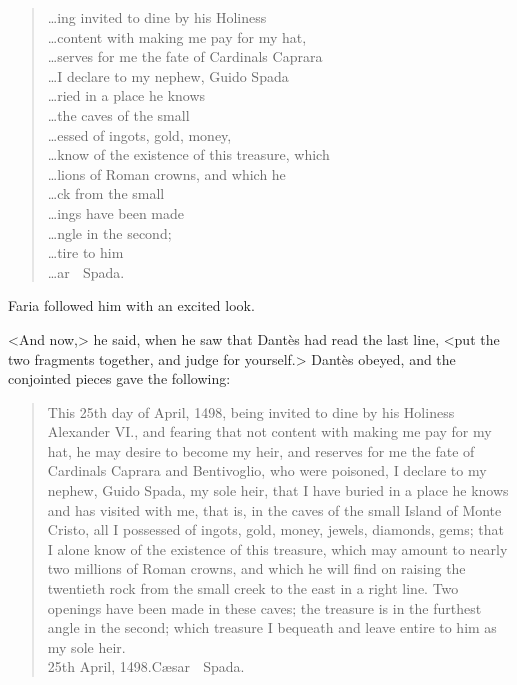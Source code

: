 \begin{quotation}\raggedleft\oldfont
 \dots ing invited to dine by his Holiness\\         
 \dots con\-tent with making me pay for my hat,\\    
 \dots serves for me the fate of Cardinals Cap\-ra\-ra\\            
 \dots I declare to my nephew, Guido Spada\\                       
 \dots ried in a place he knows\\                         
 \dots the caves of the small\\                  
 \dots essed of ingots, gold, money,\\  
 \dots know of the existence of this treasure, which\\            
 \dots lions of Roman crowns, and which he\\                              
 \dots ck from the small\\                            
 \dots ings have been made\\                            
 \dots ngle in the second;\\                                    
 \dots tire to him\\                                     
 \dots ar  Spada.\\
 \end{quotation}

 Faria followed him with an excited look. 

 <And now,> he said, when he saw that Dantès had read the last line, <put the two fragments together, and judge for yourself.> Dantès obeyed, and the conjointed pieces gave the following:  
 

\begin{quotation}\oldfont
 This 25th day of April, 1498, being invited to dine by his Holiness Alexander VI., and fearing that not content with making me pay for my hat, he may desire to become my heir, and reserves for me the fate of Cardinals Caprara and Bentivoglio, who were poisoned, I declare to my nephew, Guido Spada, my sole heir, that I have buried in a place he knows and has visited with me, that is, in the caves of the small Island of Monte Cristo, all I possessed of ingots, gold, money, jewels, diamonds, gems; that I alone know of the existence of this treasure, which may amount to nearly two millions of Roman crowns, and which he will find on raising the twentieth rock from the small creek to the east in a right line. Two openings have been made in these caves; the treasure is in the furthest angle in the second; which treasure I bequeath and leave entire to him as my sole heir. \\
25th April, 1498.\hfill Cæsar  Spada.
 \end{quotation}


